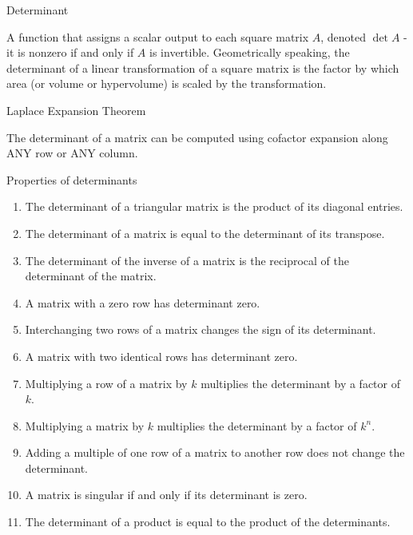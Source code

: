 \documentclass{ximera}
\begin{document}
Determinant
\begin{expandable}{}{}
    A function that assigns a scalar output to each square matrix $A$, denoted $\det A$ - it is nonzero if and only if $A$ is invertible.  Geometrically speaking, the determinant of a linear transformation of a square matrix is the factor by which area (or volume or hypervolume) is scaled by the transformation.
\end{expandable}


Laplace Expansion Theorem
\begin{expandable}{}{}
    The determinant of a matrix can be computed using cofactor expansion along ANY row or ANY column.
\end{expandable}


Properties of determinants
\begin{expandable}{}{}
\begin{enumerate}
    \item The determinant of a triangular matrix is the product of its diagonal entries.

    \item The determinant of a matrix is equal to the determinant of its transpose.

    \item The determinant of the inverse of a matrix is the reciprocal of the determinant of the matrix.

    \item A matrix with a zero row has determinant zero.

    \item Interchanging two rows of a matrix changes the sign of its determinant.

    \item A matrix with two identical rows has determinant zero.

    \item Multiplying a row of a matrix by $k$ multiplies the determinant by a factor of $k$.

    \item Multiplying a matrix by $k$ multiplies the determinant by a factor of $k^n$.

    \item Adding a multiple of one row of a matrix to another row does not change the determinant. 

    \item A matrix is singular if and only if its determinant is zero.

    \item The determinant of a product is equal to the product of the determinants.
\end{enumerate}
\end{expandable}

\end{document}
